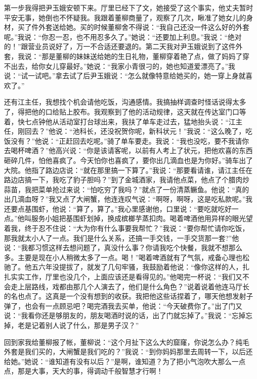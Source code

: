 \documentclass[12pt,oneside]{book}
\begin{document}
第一步我得把尹玉娥安顿下来。厅里已经下了文，她接受了这个事实，他丈夫暂时平安无事，她倒也不怀疑我。我跟着董柳商量了，观察了几次，瞅准了她女儿的身材，买了件外套送给她。买的时候董柳舍不得说：``我自己还没一件这么好的外套呢。''我说：``你忍一忍，也不用忍多久了。''她说：``还要加上利息。''我说：``绝对的！''跟营业员说好了，万一不合适还要退的。第二天我对尹玉娥说到了这件外套，我说：``那是董柳的妹妹送给她的生日礼物，董柳穿着艳了点，做了妈妈了穿不出去，给你女儿穿最好。''她说：``我家小青很刁的，她也知道爱漂亮了。''我说：``试一试吧。''拿去试了后尹玉娥说：``怎么就像特意给她买的，她一穿上身就喜欢了。''

还有江主任，我想找个机会请他吃饭，沟通感情。我搞抽样调查时怪话说得太多了，得把他的口给贴上胶布。我观察到了他的活动规律，这天就在传达室门口等着，快七点钟他从活动室打台球出来，我扶了单车走过去，猛地抬头说：``江主任，刚回去？''他说：``池科长，还没祝贺你呢，新科状元！''我说：``这么晚了，吃饭没有？''他说：``正赶回去吃呢。''骑了单车要走。我说：``我也没吃，要不我请你去喝杯啤酒？''他高兴说：``你是该请客呢，以前有人考上了状元，把他欢喜的东西砸碎几件，怕他喜疯了。今天怕你也喜疯了，要你出几滴血也是为你好。''骑车出了大院。他指了路边店说：``就在那里搞一下算了。''我说：``那要看请谁，请江主任在路边店搞一下，我吃了豹子胆吗？''到了金城酒家，我请他点菜，他点了个腊肉炒蒜苗，我把菜单抢过来说：``怕吃穷了我吗？''就点了一份清蒸鳜鱼。他说：``真的出几滴血呀？''我又点了大闸蟹，他连连叹气说：``啊呀，啊呀，这是吃私款呢。''我还要点基围虾，他说：``算了，算了。''我心里感谢他，口里说：``要吃就吃好一点。''他叫服务小姐把基围虾划掉，换成槟榔芋蒸扣肉。喝着啤酒他用异样的眼光望着我，终于忍不住说：``大为你有什么事要我帮忙？''我说：``要你帮忙请你吃饭，那我就太小人了一点。我们是什么关系，还搞一手交钱，一手交货那一套?''他说：``我都习惯这样去想问题了，真没什么事？你请我吃个快餐，我就不想那么多。主要是现在小人稍微太多了一点。喝！''喝着啤酒就有了气氛，戒备心理也松驰了。他五六年没提拔了，就发了几句牢骚，我鼓励着他说：``像你这样的人，扎扎实实工作，厅里也没几个，上面应该还是看得见的。''他喝完一杯说：``我们又不会走上层路线，戏都由那几个人演去了，他们是什么角色？''说着说着他连马厅长的名也点了。这真是一个没有想到的收获。我把他这些话捏着了，哪天他想发射子弹了，也会有一点顾忌吧？喝完酒我去买单，他说：``今天破费你了。''出了门又说：``我看你还是够朋友的，朋友喝酒时说的话，出了门就忘掉了。''我说：``忘掉忘掉，老是记着别人说了什么，那是男子汉？''

回到家我给董柳报了帐，董柳说：``这个月扯下这么大的窟窿，你说怎么办？纯毛外套是我们买的，大闸蟹是我们吃的？''我说：``到你妈妈那里去周转一下，以后还给她。''她说：``谁知道有没有以后？''是啊，谁知道？为了把小气泡吹大那么一点点，那是大事，天大的事，得调动千般智慧才行啊！
\end{document}
